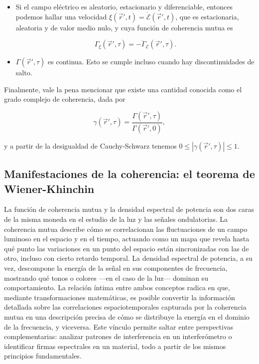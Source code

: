 \begin{itemize}
		\begin{equation}
			\int_{T_1}^{T_2}\int_{T_1}^{T_2} f^*(\vec{r}',t)f(\vec{r}',t')\Gamma(\vec{r}',t'-t)\,dt\,dt' \geq 0.
		\end{equation}

		\item[e)] Si el campo eléctrico es aleatorio, estacionario y diferenciable, entonces podemos hallar una velocidad $\xi (\vec{r}',t) = \dot{\mathcal{E}}(\vec{r}',t)$, que es estacionaria, aleatoria y de valor medio nulo, y cuya función de coherencia mutua es

		\begin{equation}
			\Gamma_\xi(\vec{r}',\tau) = - \ddot{\Gamma}_\mathcal{E}(\vec{r}',\tau).
		\end{equation}

		\item[f)] $\Gamma(\vec{r}',\tau)$ es continua. Esto se cumple incluso cuando hay discontinuidades de salto.
	\end{itemize}

	Finalmente, vale la pena mencionar que existe una cantidad conocida como el grado complejo de coherencia, dada por

	\begin{equation}
		\gamma (\vec{r}',\tau) = \frac{\Gamma(\vec{r}',\tau)}{\Gamma(\vec{r}',0)},
	\end{equation}

	y a partir de la desigualdad de Cauchy-Schwarz tenemos $0 \leq |\gamma(\vec{r}',\tau)| \leq 1$.

	\subsection{Manifestaciones de la coherencia: el teorema de Wiener-Khinchin}

		La función de coherencia mutua y la densidad espectral de potencia son dos caras de la misma moneda en el estudio de la luz y las señales ondulatorias. La coherencia mutua describe cómo se correlacionan las fluctuaciones de un campo luminoso en el espacio y en el tiempo, actuando como un mapa que revela hasta qué punto las variaciones en un punto del espacio están sincronizadas con las de otro, incluso con cierto retardo temporal. La densidad espectral de potencia, a su vez, descompone la energía de la señal en sus componentes de frecuencia, mostrando qué tonos o colores —en el caso de la luz— dominan su comportamiento. La relación íntima entre ambos conceptos radica en que, mediante transformaciones matemáticas, es posible convertir la información detallada sobre las correlaciones espaciotemporales capturada por la coherencia mutua en una descripción precisa de cómo se distribuye la energía en el dominio de la frecuencia, y viceversa. Este vínculo permite saltar entre perspectivas complementarias: analizar patrones de interferencia en un interferómetro o identificar firmas espectrales en un material, todo a partir de los mismos principios fundamentales.

